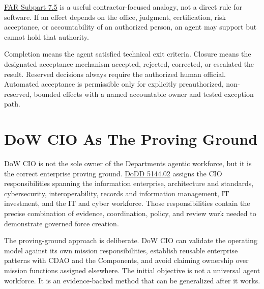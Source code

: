 \documentclass[11pt]{article}
\begin{document}
\href{https://www.acquisition.gov/far/subpart-7.5}{FAR Subpart 7.5} is a
useful contractor-focused analogy, not a direct rule for software. If an
effect depends on the office, judgment, certification, risk acceptance,
or accountability of an authorized person, an agent may support but
cannot hold that authority.

Completion means the agent satisfied technical exit criteria. Closure
means the designated acceptance mechanism accepted, rejected, corrected,
or escalated the result. Reserved decisions always require the
authorized human official. Automated acceptance is permissible only for
explicitly preauthorized, non-reserved, bounded effects with a named
accountable owner and tested exception path.

\hypertarget{3-dow-cio-as-the-proving-ground}{%
\section{DoW CIO As The Proving
Ground}\label{3-dow-cio-as-the-proving-ground}}

DoW CIO is not the sole owner of the Department\textquotesingle s
agentic workforce, but it is the correct enterprise proving ground.
\href{https://www.esd.whs.mil/Portals/54/Documents/DD/issuances/dodd/514402p.pdf}{DoDD
5144.02} assigns the CIO responsibilities spanning the information
enterprise, architecture and standards, cybersecurity, interoperability,
records and information management, IT investment, and the IT and cyber
workforce. Those responsibilities contain the precise combination of
evidence, coordination, policy, and review work needed to demonstrate
governed force creation.

The proving-ground approach is deliberate. DoW CIO can validate the
operating model against its own mission responsibilities, establish
reusable enterprise patterns with CDAO and the Components, and avoid
claiming ownership over mission functions assigned elsewhere. The
initial objective is not a universal agent workforce. It is an
evidence-backed method that can be generalized after it works.
\end{document}
